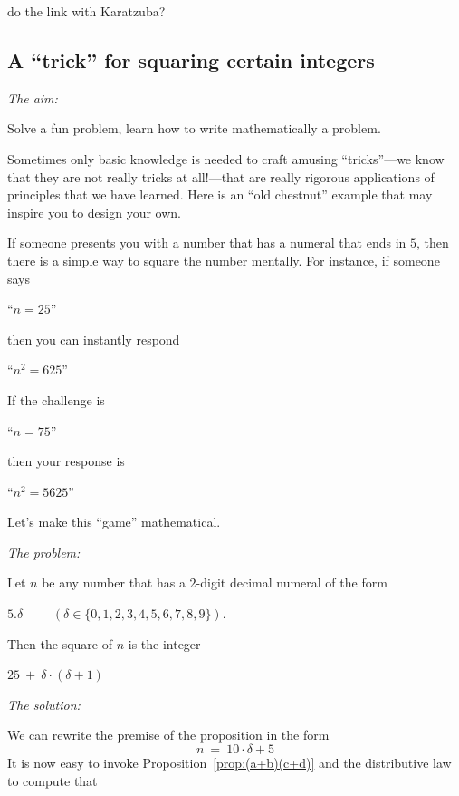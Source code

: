 {\Denis do the link with Karatzuba?}


\subsection{A ``trick'' for squaring certain integers}

\noindent \textit{The aim:}

Solve a fun problem, learn how to write mathematically a problem.

Sometimes only basic knowledge is needed to craft amusing
``tricks''---we know that they are not really tricks at all!---that
are really rigorous applications of principles that we have learned.
Here is an ``old chestnut'' example that may inspire you to design
your own. 

If someone presents you with a number that has a numeral that ends in
$5$, then there is a simple way to square the number mentally.  For
instance, if someone says

\hspace{.25in}``$n = 25$''

\noindent
then you can instantly respond

\hspace{.25in}``$n^2 = 625$''

\noindent
If the challenge is

\hspace{.25in}``$n = 75$''

\noindent
then your response is

\hspace{.25in}``$n^2 = 5625$''

\noindent
Let's make this ``game'' mathematical.
\medskip


\noindent \textit{The problem:}

Let $n$ be any number that has a $2$-digit decimal numeral of the form

\hspace{.25in}$5.\delta$ \ \ \ \ $(\delta \in \{ 0,1,2,3,4,5,6,7,8,9\})$.

\noindent
Then the square of $n$ is the integer

\hspace{.25in}$25 \ + \ \delta \cdot (\delta +1)$
\medskip

\noindent \textit{The solution:}

We can rewrite the premise of the proposition in the form
\[ n \ = \ 10 \cdot \delta + 5 \]
It is now easy to invoke Proposition~\ref{prop:(a+b)(c+d)} and the
distributive law to compute that

